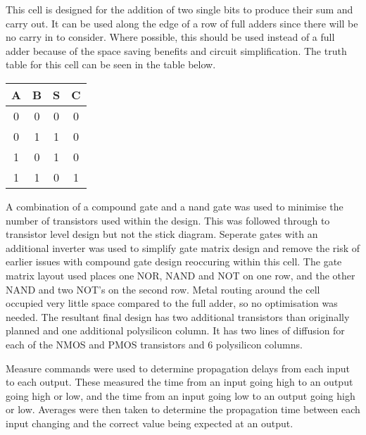 
This cell is designed for the addition of two single bits to produce their sum and carry out. 
It can be used along the edge of a row of full adders since there will be no carry in to consider. Where possible, this should be used instead of a full adder because of the space saving benefits and circuit simplification. 
The truth table for this cell can be seen in the table below.

\begin{tabular}{| c | c || c | c |}
\hline
A & B &  S & C \\ \hline
0 & 0 &  0 & 0 \\
0 & 1 &  1 & 0 \\
1 & 0 &  1 & 0 \\
1 & 1 &  0 & 1 \\ \hline
\end{tabular}

A combination of a compound gate and a nand gate was used to minimise the number of transistors used within the design.
This was followed through to transistor level design but not the stick diagram. Seperate gates with an additional inverter was used to simplify gate matrix design and remove the risk of earlier issues with compound gate design reoccuring within this cell.
The gate matrix layout used places one NOR, NAND and NOT on one row, and the other NAND and two NOT's on the second row. Metal routing around the cell occupied very little space compared to the full adder, so no optimisation was needed.
The resultant final design has two additional transistors than originally planned and one additional polysilicon column. 
It has two lines of diffusion for each of the NMOS and PMOS transistors and 6 polysilicon columns. 


Measure commands were used to determine propagation delays from each input to each output. These measured the time from an input going high to an output going high or low, and the time from an input going low to an output going high or low. 
Averages were then taken to determine the propagation time between each input changing and the correct value being expected at an output. 
